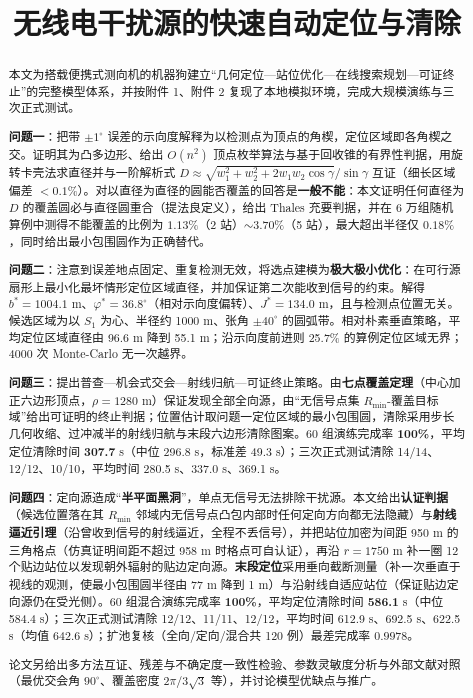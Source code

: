 \documentclass[withoutpreface,bwprint]{cumcmthesis}
\title{无线电干扰源的快速自动定位与清除}
\date{}
\begin{document}
\maketitle

\begin{abstract}
本文为搭载便携式测向机的机器狗建立“几何定位—站位优化—在线搜索规划—可证终止”的完整模型体系，并按附件 1、附件 2 复现了本地模拟环境，完成大规模演练与三次正式测试。

\textbf{问题一}：把带 $\pm1^{\circ}$ 误差的示向度解释为以检测点为顶点的角楔，定位区域即各角楔之交。证明其为凸多边形、给出 $O(n^2)$ 顶点枚举算法与基于回收锥的有界性判据，用旋转卡壳法求直径并与一阶解析式 $D\!\approx\!\sqrt{w_1^2\!+\!w_2^2\!+\!2w_1w_2\cos\gamma}/\sin\gamma$ 互证（细长区域偏差 $<0.1\%$）。对以直径为直径的圆能否覆盖的回答是\textbf{一般不能}：本文证明任何直径为 $D$ 的覆盖圆必与直径圆重合（提法良定义），给出 Thales 充要判据，并在 6 万组随机算例中测得不能覆盖的比例为 $1.13\%$（2 站）$\sim3.70\%$（5 站），最大超出半径仅 $0.18\%$，同时给出最小包围圆作为正确替代。

\textbf{问题二}：注意到误差地点固定、重复检测无效，将选点建模为\textbf{极大极小优化}：在可行源扇形上最小化最坏情形定位区域直径，并加保证第二次能收到信号的约束。解得 $b^{*}=1004.1$ m、$\varphi^{*}=36.8^{\circ}$（相对示向度偏转）、$J^{*}=134.0$ m，且与检测点位置无关。候选区域为以 $S_1$ 为心、半径约 1000 m、张角 $\pm40^{\circ}$ 的圆弧带。相对朴素垂直策略，平均定位区域直径由 96.6 m 降到 55.1 m；沿示向度前进则 25.7\% 的算例定位区域无界；4000 次 Monte-Carlo 无一次越界。

\textbf{问题三}：提出普查—机会式交会—射线归航—可证终止策略。由\textbf{七点覆盖定理}（中心加正六边形顶点，$\rho=1280$ m）保证发现全部全向源，由“无信号点集 $R_{\min}$-覆盖目标域”给出可证明的终止判据；位置估计取问题一定位区域的最小包围圆，清除采用步长几何收缩、过冲减半的射线归航与末段六边形清除图案。60 组演练完成率 \textbf{100\%}，平均定位清除时间 \textbf{307.7} s（中位 296.8 s，标准差 49.3 s）；三次正式测试清除 14/14、12/12、10/10，平均时间 280.5 s、337.0 s、369.1 s。

\textbf{问题四}：定向源造成“\textbf{半平面黑洞}”，单点无信号无法排除干扰源。本文给出\textbf{认证判据}（候选位置落在其 $R_{\min}$ 邻域内无信号点凸包内部时任何定向方向都无法隐藏）与\textbf{射线逼近引理}（沿曾收到信号的射线逼近，全程不丢信号），并把站位加密为间距 950 m 的三角格点（仿真证明间距不超过 958 m 时格点可自认证），再沿 $r=1750$ m 补一圈 12 个贴边站位以发现朝外辐射的贴边定向源。\textbf{末段定位}采用垂向截断测量（补一次垂直于视线的观测，使最小包围圆半径由 77 m 降到 1 m）与沿射线自适应站位（保证贴边定向源仍在受光侧）。60 组混合演练完成率 \textbf{100\%}，平均定位清除时间 \textbf{586.1} s（中位 584.4 s）；三次正式测试清除 12/12、11/11、12/12，平均时间 612.9 s、692.5 s、622.5 s（均值 642.6 s）；扩池复核（全向/定向/混合共 120 例）最差完成率 $0.9978$。

论文另给出多方法互证、残差与不确定度一致性检验、参数灵敏度分析与外部文献对照（最优交会角 $90^{\circ}$、覆盖密度 $2\pi/3\sqrt3$ 等），并讨论模型优缺点与推广。

\end{abstract}
\end{document}
